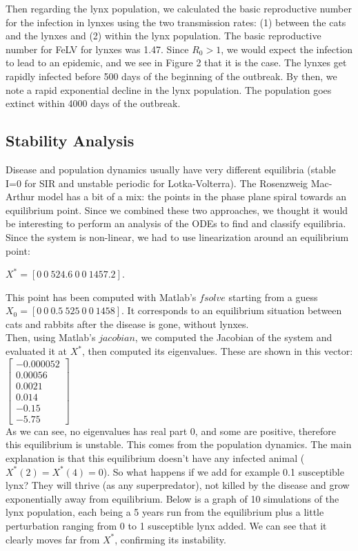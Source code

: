 \documentclass[12pt]{article}
\begin{document}
\quad Then regarding the lynx population, we calculated the basic reproductive number for the infection in lynxes using the two transmission rates: (1) between the cats and the lynxes and (2) within the lynx population.  The basic reproductive number for FeLV for lynxes was 1.47. Since $R_0 > 1$, we would expect the infection to lead to an epidemic, and we see in Figure 2 that it is the case. The lynxes get rapidly infected before 500 days of the beginning of the outbreak. By then, we note a rapid exponential decline in the lynx population. The population goes extinct within 4000 days of the outbreak.


\subsection{Stability Analysis }

\quad Disease and population dynamics usually have very different equilibria (stable I=0 for SIR and unstable periodic for Lotka-Volterra). The Rosenzweig Mac-Arthur model has a bit of a mix: the points in the phase plane spiral towards an equilibrium point. Since we combined these two approaches, we thought it would be interesting to perform an analysis of the ODEs to find and classify equilibria. \\

\quad Since the system is non-linear, we had to use linearization around an equilibrium point:

$X^{*} = [0 \ 0 \ 524.6 \ 0 \ 0 \ 1457.2]$. 

This point has been computed with Matlab's $fsolve $ starting from a guess $X_{0} = [0 \ 0 \ 0.5 \ 525 \ 0 \ 0 \ 1458]$. It corresponds to an equilibrium situation between cats and rabbits after the disease is gone, without lynxes. \\

\quad Then, using Matlab's $jacobian$, we computed the Jacobian of the system and evaluated it at $X^{*}$, then computed its eigenvalues. These are shown in this vector:
$
\begin{bmatrix}
    -0.000052 \\ 0.00056\\ 0.0021\\ 0.014\\ -0.15\\ -5.75
\end{bmatrix}
$\\

\quad As we can see, no eigenvalues has real part 0, and some are positive, therefore this equilibrium is unstable. This comes from the population dynamics. The main explanation is that this equilibrium doesn't have any infected animal ($X^{*}(2) = X^{*}(4) = 0$). So what happens if we add for example 0.1 susceptible lynx? They will thrive (as any superpredator), not killed by the disease and grow exponentially away from equilibrium. Below is a graph of 10 simulations of the lynx population, each being a 5 years run from the equilibrium plus a little perturbation ranging from 0 to 1 susceptible lynx added. We can see that it clearly moves far from $X^{*}$, confirming its instability.
\end{document}
